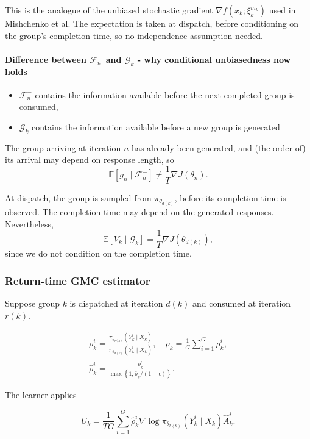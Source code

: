 This is the analogue of the unbiased stochastic gradient
$\nabla f(x_k;\xi_k^{m_k})$ used in Mishchenko et al.
The expectation is taken at dispatch, before conditioning
on the group's completion time, so no independence assumption needed.

\paragraph{Difference between $\mathcal F_n^-$ and $\mathcal G_k$ - why conditional unbiasedness now holds}
\begin{itemize}
    \item $\mathcal F_n^-$ contains the information available before the next
completed group is consumed,
    \item $\mathcal G_k$ contains the
information available before a new group is generated
\end{itemize}
The group arriving at iteration $n$ has already been generated, and (the order of) its arrival may depend on response
length, so
\begin{equation*}
\mathbb E[g_n\mid\mathcal F_n^-]
\neq \frac1T\nabla J(\theta_n).
\end{equation*}


At dispatch, the group is sampled from
$\pi_{\theta_{d(k)}}$, before its completion time
is observed. The completion time may depend on
the generated responses. Nevertheless,
\[
\mathbb E[V_k\mid\mathcal G_k]
=\frac1T\nabla J(\theta_{d(k)}),
\]
since we do not condition on the completion time.

\subsubsection{Return-time GMC estimator}

Suppose group $k$ is dispatched at iteration $d(k)$ and consumed at iteration $r(k)$.

$$
\begin{gathered}
\rho_k^i=\frac{\pi_{\theta_{r(k)}}\left(Y_k^i \mid X_k\right)}{\pi_{\theta_{d(k)}}\left(Y_k^i \mid X_k\right)}, \quad \overline{\rho_k}=\frac{1}{G} \sum_{i=1}^G \rho_k^i, \\
\hat{\rho}_k^i=\frac{\rho_k^i}{\max \left\{1, \bar{\rho}_k /(1+\epsilon)\right\}} .
\end{gathered}
$$

The learner applies

$$
U_k=\frac{1}{T G} \sum_{i=1}^G \hat{\rho}_k^i \nabla \log \pi_{\theta_{r(k)}}\left(Y_k^i \mid X_k\right) \widehat{A}_k^i .
$$

